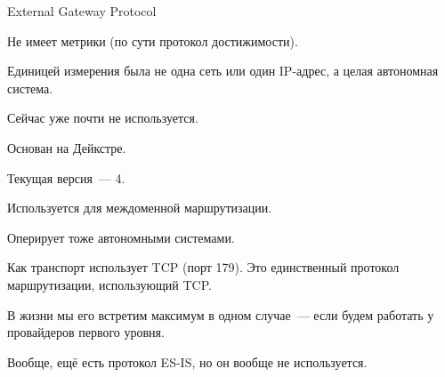 
External Gateway Protocol

Не имеет метрики (по сути протокол достижимости).

Единицей измерения была не одна сеть или один IP-адрес, а целая автономная система.

Сейчас уже почти не используется.


Основан на Дейкстре.

Текущая версия~--- 4.

Используется для междоменной маршрутизации.

Оперирует тоже автономными системами.

Как транспорт использует TCP (порт 179). Это единственный протокол маршрутизации, использующий TCP.

В жизни мы его встретим максимум в одном случае~--- если будем работать у провайдеров первого уровня.

Вообще, ещё есть протокол ES-IS, но он вообще не используется.

